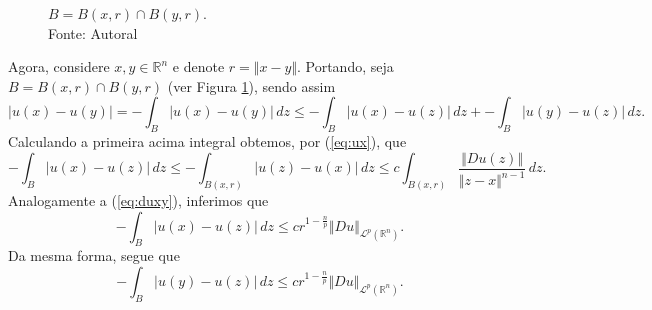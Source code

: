 \documentclass[a4paper, 11pt]{book}
\theoremstyle{definition}
\newcommand{\bR}{\mathbb{R}}
\newcommand{\cL}{\mathcal{L}}
\newcommand{\sint}{-\!\!\!\!\!\!\int}
\begin{document}
\begin{prf}
    \begin{figure}
        \centering
        \caption{$B = B(x,r) \cap B(y,r)$.\\
        Fonte: Autoral}
        \label{fig:B}
    \end{figure}
    Agora, considere $x, y \in \bR^n$ e denote $r = \Vert x - y \Vert$. Portando, seja $B = B(x,r) \cap B(y,r)$ (ver Figura \ref{fig:B}), sendo assim
    \begin{equation} \label{eq:abcd}
        |u(x) - u(y)| = \sint_{B} |u(x) - u(y)| \,dz \leqslant \sint_{B} |u(x) - u(z)| \,dz + \sint_B |u(y) - u(z)| \,dz.
    \end{equation}
    Calculando a primeira acima integral obtemos, por (\ref{eq:ux}), que
    \[
        \sint_B |u(x) - u(z)| \,dz \leqslant \sint_{B(x,r)} |u(z) - u(x)| \,dz \leqslant c \int_{B(x,r)} \frac{\Vert Du(z) \Vert}{\Vert z - x \Vert^{n-1}} \,dz.
    \]
    Analogamente a (\ref{eq:duxy}), inferimos que
    \[
        \sint_B |u(x) - u(z)| \,dz \leqslant cr^{1 - \frac{n}{p}} \Vert Du \Vert_{\cL^p(\bR^n)}.
    \]
    Da mesma forma, segue que
    \[
        \sint_B |u(y) - u(z)| \,dz \leqslant cr^{1 - \frac{n}{p}} \Vert Du \Vert_{\cL^p(\bR^n)}.
    \]


\end{prf}
\end{document}
